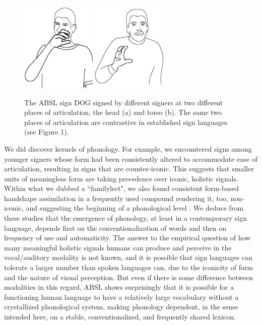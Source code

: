 \documentclass[output=paper]{langsci/langscibook}
\begin{document}
\begin{figure}
\includegraphics[width=0.32\textwidth]{figures/4a_DOG__face_.jpg}
\includegraphics[width=0.32\textwidth]{figures/4ba__DOG__torso_.jpg}
\caption{The ABSL sign DOG signed by different signers at two different places of articulation, the head (a) and torso (b). The same two places of articulation are contrastive in established sign languages (see Figure 1).}
\label{fig:sandler:4}
\end{figure}

   We did discover kernels of phonology. For example, we encountered signs among younger signers whose form had been consistently altered to accommodate ease of articulation, resulting in signs that are counter-iconic.  This suggests that smaller units of meaningless form are taking precedence over iconic, holistic signals. Within what we dubbed a ``familylect", we also found consistent form-based handshape assimilation in a frequently used compound rendering it, too, non-iconic, and suggesting the beginning of a phonological level \citep{Sandler2011a,Sandler2014nordlyd}.  We deduce from these studies that the emergence of phonology, at least in a contemporary sign language, depends first on the conventionalization   of words and then on frequency of use and automaticity.  The answer to the empirical question of how many meaningful holistic signals humans can produce and perceive in the vocal/auditory modality is not known, and it is possible that sign languages can tolerate a larger number than spoken languages can, due to the iconicity of form and the nature of visual perception.  But even if there is some difference between modalities in this regard, ABSL shows surprisingly that it is possible for a functioning human language to have a relatively large vocabulary without a crystallized phonological system, making phonology dependent, in the sense intended here, on a stable, conventionalized, and frequently shared lexicon.  
\end{document}
